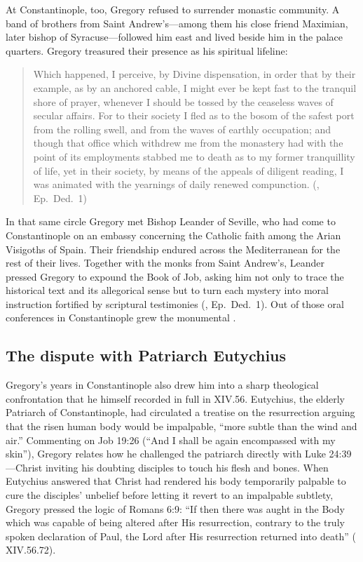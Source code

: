 At Constantinople, too, Gregory refused to surrender monastic community. A band
of brothers from Saint Andrew's---among them his close friend Maximian, later
bishop of Syracuse---followed him east and lived beside him in the palace
quarters. Gregory treasured their presence as his spiritual lifeline:

\begin{quote}
Which happened, I perceive, by Divine dispensation, in order that by their
example, as by an anchored cable, I might ever be kept fast to the tranquil
shore of prayer, whenever I should be tossed by the ceaseless waves of secular
affairs. For to their society I fled as to the bosom of the safest port from
the rolling swell, and from the waves of earthly occupation; and though that
office which withdrew me from the monastery had with the point of its
employments stabbed me to death as to my former tranquillity of life, yet in
their society, by means of the appeals of diligent reading, I was animated with
the yearnings of daily renewed compunction. (, Ep.\ Ded.\
1)
\end{quote}

In that same circle Gregory met Bishop Leander of Seville, who had come to
Constantinople on an embassy concerning the Catholic faith among the Arian
Visigoths of Spain. Their friendship endured across the Mediterranean for the
rest of their lives. Together with the monks from Saint Andrew's, Leander
pressed Gregory to expound the Book of Job, asking him not only to trace the
historical text and its allegorical sense but to turn each mystery into moral
instruction fortified by scriptural testimonies (\work{Moralia}, Ep.\ Ded.\ 1).
Out of those oral conferences in Constantinople grew the monumental
\work{Moralia in Iob}.

\subsection{The dispute with Patriarch Eutychius}

Gregory's years in Constantinople also drew him into a sharp theological
confrontation that he himself recorded in full in \work{Moralia in Iob} XIV.56.
Eutychius, the elderly Patriarch of Constantinople, had circulated a treatise
on the resurrection arguing that the risen human body would be impalpable,
``more subtle than the wind and air.'' Commenting on Job 19:26 (``And I shall be
again encompassed with my skin''), Gregory relates how he challenged the
patriarch directly with Luke 24:39---Christ inviting his doubting disciples to
touch his flesh and bones. When Eutychius answered that Christ had rendered his
body temporarily palpable to cure the disciples' unbelief before letting it
revert to an impalpable subtlety, Gregory pressed the logic of Romans 6:9:
``If then there was aught in the Body which was capable of being altered after
His resurrection, contrary to the truly spoken declaration of Paul, the Lord
after His resurrection returned into death'' (\work{Moralia} XIV.56.72).

